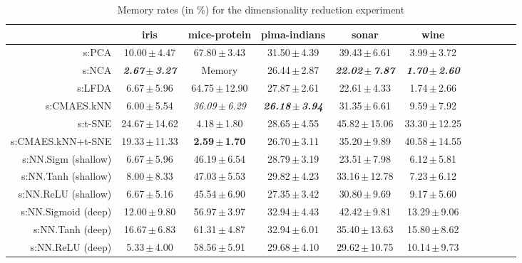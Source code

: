 \begin{table}[ht]
{\begin{tabular}{rcccccccccc}
\midrule
& \multicolumn{1}{c}{iris} & \multicolumn{1}{c}{mice-protein} & \multicolumn{1}{c}{pima-indians} & \multicolumn{1}{c}{sonar} & \multicolumn{1}{c}{wine} \\ 
\midrule
s:PCA & 10.00\,$\pm$\,4.47 & 67.80\,$\pm$\,3.43 & 31.50\,$\pm$\,4.39 & 39.43\,$\pm$\,6.61 & 3.99\,$\pm$\,3.72 \\
s:NCA & \emph{\textbf{2.67\,$\pm$\,3.27}} & Memory  & 26.44\,$\pm$\,2.87 & \emph{\textbf{22.02\,$\pm$\,7.87}} & \emph{\textbf{1.70\,$\pm$\,2.60}} \\
s:LFDA & 6.67\,$\pm$\,5.96 & 64.75\,$\pm$\,12.90 & 27.87\,$\pm$\,2.61 & 22.61\,$\pm$\,4.33 & 1.74\,$\pm$\,2.66 \\
s:CMAES.kNN & 6.00\,$\pm$\,5.54 & \emph{36.09\,$\pm$\,6.29} & \emph{\textbf{26.18\,$\pm$\,3.94}} & 31.35\,$\pm$\,6.61 & 9.59\,$\pm$\,7.92 \\
s:t-SNE & 24.67\,$\pm$\,14.62 & 4.18\,$\pm$\,1.80 & 28.65\,$\pm$\,4.55 & 45.82\,$\pm$\,15.06 & 33.30\,$\pm$\,12.25 \\
s:CMAES.kNN+t-SNE & 19.33\,$\pm$\,11.33 & \textbf{2.59\,$\pm$\,1.70} & 26.70\,$\pm$\,3.11 & 35.20\,$\pm$\,9.89 & 40.58\,$\pm$\,14.55 \\
s:NN.Sigm (shallow) & 6.67\,$\pm$\,5.96 & 46.19\,$\pm$\,6.54 & 28.79\,$\pm$\,3.19 & 23.51\,$\pm$\,7.98 & 6.12\,$\pm$\,5.81 \\
s:NN.Tanh (shallow) & 8.00\,$\pm$\,8.33 & 47.03\,$\pm$\,5.53 & 29.82\,$\pm$\,4.23 & 33.16\,$\pm$\,12.78 & 7.23\,$\pm$\,6.12 \\
s:NN.ReLU (shallow) & 6.67\,$\pm$\,5.16 & 45.54\,$\pm$\,6.90 & 27.35\,$\pm$\,3.42 & 30.80\,$\pm$\,9.69 & 9.17\,$\pm$\,5.60 \\
s:NN.Sigmoid (deep) & 12.00\,$\pm$\,9.80 & 56.97\,$\pm$\,3.97 & 32.94\,$\pm$\,4.43 & 42.42\,$\pm$\,9.81 & 13.29\,$\pm$\,9.06 \\
s:NN.Tanh (deep) & 16.67\,$\pm$\,6.83 & 61.31\,$\pm$\,4.87 & 32.94\,$\pm$\,6.01 & 35.40\,$\pm$\,13.63 & 15.80\,$\pm$\,8.62 \\
s:NN.ReLU (deep) & 5.33\,$\pm$\,4.00 & 58.56\,$\pm$\,5.91 & 29.68\,$\pm$\,4.10 & 29.62\,$\pm$\,10.75 & 10.14\,$\pm$\,9.73 \\


\bottomrule
\end{tabular}
}
\caption{Memory rates (in \%) for the dimensionality reduction experiment} \label{tab:dim-Memory-rates}
\end{table}
